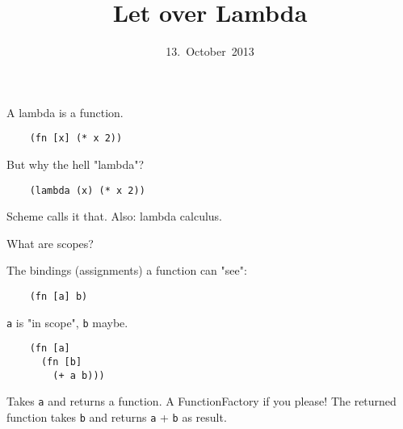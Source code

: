 

\title{Let over Lambda}
\date{13.~October~2013}



\frame{\titlepage}


\begin{frame}[fragile]
  \begin{center}
    A lambda is a function.
  \end{center}
  \pause
  \begin{verbatim}
    (fn [x] (* x 2))
  \end{verbatim}
\end{frame}

\begin{frame}[fragile]
  \begin{center}
    But why the hell "lambda"?
  \end{center}
  \begin{verbatim}
    (lambda (x) (* x 2))
  \end{verbatim}
  \begin{center}
    Scheme calls it that. Also: lambda calculus.
  \end{center}
\end{frame}

\begin{frame}[fragile]
  What are scopes?

  \pause
  The bindings (assignments) a function can "see":

  \begin{verbatim}
    (fn [a] b)
  \end{verbatim}

  \texttt{a} is "in scope", \texttt{b} maybe.
\end{frame}


\begin{frame}[fragile]
  \begin{verbatim}
    (fn [a]
      (fn [b]
        (+ a b)))
  \end{verbatim}
  Takes \texttt{a} and returns a function. A FunctionFactory if you please!
  The returned function takes \texttt{b} and returns \texttt{a} + \texttt{b}
  as result.
\end{frame}


